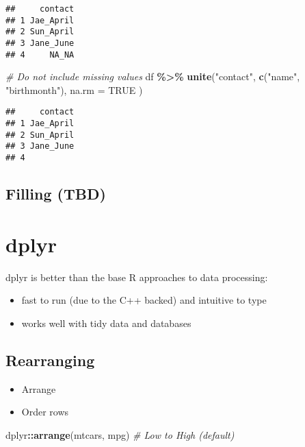 \documentclass[
]{book}
\newenvironment{Shaded}{\begin{snugshade}}{\end{snugshade}}
\newcommand{\CommentTok}[1]{\textcolor[rgb]{0.56,0.35,0.01}{\textit{#1}}}
\newcommand{\DataTypeTok}[1]{\textcolor[rgb]{0.13,0.29,0.53}{#1}}
\newcommand{\KeywordTok}[1]{\textcolor[rgb]{0.13,0.29,0.53}{\textbf{#1}}}
\newcommand{\NormalTok}[1]{#1}
\newcommand{\OperatorTok}[1]{\textcolor[rgb]{0.81,0.36,0.00}{\textbf{#1}}}
\newcommand{\OtherTok}[1]{\textcolor[rgb]{0.56,0.35,0.01}{#1}}
\newcommand{\StringTok}[1]{\textcolor[rgb]{0.31,0.60,0.02}{#1}}
\providecommand{\tightlist}{%
  \setlength{\itemsep}{0pt}\setlength{\parskip}{0pt}}
\begin{document}
\begin{verbatim}
##     contact
## 1 Jae_April
## 2 Sun_April
## 3 Jane_June
## 4     NA_NA
\end{verbatim}

\begin{Shaded}
\begin{Highlighting}[]
\CommentTok{\# Do not include missing values}
\NormalTok{df }\OperatorTok{\%\textgreater{}\%}\StringTok{ }\KeywordTok{unite}\NormalTok{(}\StringTok{"contact"}\NormalTok{,}
  \KeywordTok{c}\NormalTok{(}\StringTok{"name"}\NormalTok{, }\StringTok{"birthmonth"}\NormalTok{),}
  \DataTypeTok{na.rm =} \OtherTok{TRUE}
\NormalTok{)}
\end{Highlighting}
\end{Shaded}

\begin{verbatim}
##     contact
## 1 Jae_April
## 2 Sun_April
## 3 Jane_June
## 4
\end{verbatim}

\hypertarget{filling-tbd}{%
\subsection{Filling (TBD)}\label{filling-tbd}}

\hypertarget{dplyr}{%
\section{dplyr}\label{dplyr}}

dplyr is better than the base R approaches to data processing:

\begin{itemize}
\tightlist
\item
  fast to run (due to the C++ backed) and intuitive to type
\item
  works well with tidy data and databases
\end{itemize}

\hypertarget{rearranging}{%
\subsection{Rearranging}\label{rearranging}}

\begin{itemize}
\item
  Arrange
\item
  Order rows
\end{itemize}

\begin{Shaded}
\begin{Highlighting}[]
\NormalTok{dplyr}\OperatorTok{::}\KeywordTok{arrange}\NormalTok{(mtcars, mpg) }\CommentTok{\# Low to High (default)}
\end{Highlighting}
\end{Shaded}
\end{document}
